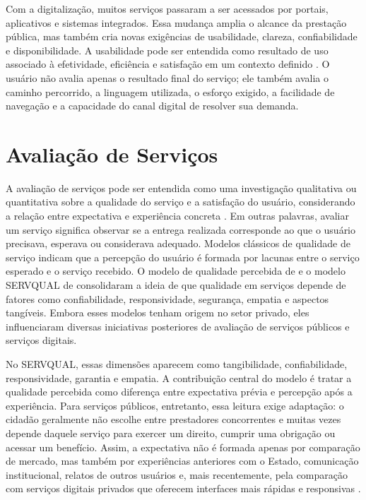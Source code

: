 Com a digitalização, muitos serviços passaram a ser acessados por portais,
aplicativos e sistemas integrados. Essa mudança amplia o alcance da prestação
pública, mas também cria novas exigências de usabilidade, clareza,
confiabilidade e disponibilidade. A usabilidade pode ser entendida como resultado
de uso associado à efetividade, eficiência e satisfação em um contexto definido
\cite{iso9241112018}. O usuário não avalia apenas o resultado final do serviço;
ele também avalia o caminho percorrido, a linguagem utilizada, o esforço exigido,
a facilidade de navegação e a capacidade do canal digital de resolver sua
demanda.

\section{Avaliação de Serviços}

A avaliação de serviços pode ser entendida como uma investigação qualitativa ou
quantitativa sobre a qualidade do serviço e a satisfação do usuário, considerando
a relação entre expectativa e experiência concreta \cite{limaPereira2020modulo1}.
Em outras palavras, avaliar um serviço significa observar se a entrega realizada
corresponde ao que o usuário precisava, esperava ou considerava adequado.
Modelos clássicos de qualidade de serviço indicam que a percepção do usuário é
formada por lacunas entre o serviço esperado e o serviço recebido. O modelo de
qualidade percebida de  e o modelo SERVQUAL de
 consolidaram a ideia de que qualidade em
serviços depende de fatores como confiabilidade, responsividade, segurança,
empatia e aspectos tangíveis. Embora esses modelos tenham origem no setor
privado, eles influenciaram diversas iniciativas posteriores de avaliação de
serviços públicos e serviços digitais.

No SERVQUAL, essas dimensões aparecem como tangibilidade, confiabilidade,
responsividade, garantia e empatia. A contribuição central do modelo é tratar a
qualidade percebida como diferença entre expectativa prévia e percepção após a
experiência. Para serviços públicos, entretanto, essa leitura exige adaptação: o
cidadão geralmente não escolhe entre prestadores concorrentes e muitas vezes
depende daquele serviço para exercer um direito, cumprir uma obrigação ou acessar
um benefício. Assim, a expectativa não é formada apenas por comparação de
mercado, mas também por experiências anteriores com o Estado, comunicação
institucional, relatos de outros usuários e, mais recentemente, pela comparação
com serviços digitais privados que oferecem interfaces mais rápidas e
responsivas \cite{parasuraman1988servqual,limaPereira2020modulo2}.

